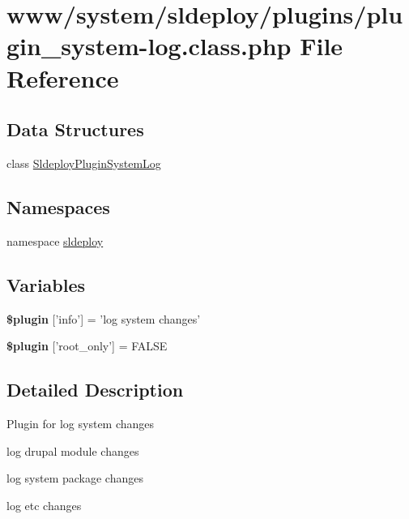 \hypertarget{plugin__system-log_8class_8php}{
\section{www/system/sldeploy/plugins/plugin\_\-system-\/log.class.php File Reference}
\label{plugin__system-log_8class_8php}
}
\subsection*{Data Structures}
\begin{DoxyCompactItemize}
\item 
class \hyperlink{class_sldeploy_plugin_system_log}{SldeployPluginSystemLog}
\end{DoxyCompactItemize}
\subsection*{Namespaces}
\begin{DoxyCompactItemize}
\item 
namespace \hyperlink{namespacesldeploy}{sldeploy}
\end{DoxyCompactItemize}
\subsection*{Variables}
\begin{DoxyCompactItemize}
\item 
\hypertarget{plugin__system-log_8class_8php_a95edf69ebbeaeedb03bab3bb010f2af9}{
{\bfseries \$plugin} \mbox{[}'info'\mbox{]} = 'log system changes'}
\label{plugin__system-log_8class_8php_a95edf69ebbeaeedb03bab3bb010f2af9}

\item 
\hypertarget{plugin__system-log_8class_8php_a1d302084fa15e3efe6c843cbb5096985}{
{\bfseries \$plugin} \mbox{[}'root\_\-only'\mbox{]} = FALSE}
\label{plugin__system-log_8class_8php_a1d302084fa15e3efe6c843cbb5096985}

\end{DoxyCompactItemize}


\subsection{Detailed Description}
Plugin for log system changes


\begin{DoxyItemize}
\item log drupal module changes
\item log system package changes
\item log etc changes
\end{DoxyItemize}


